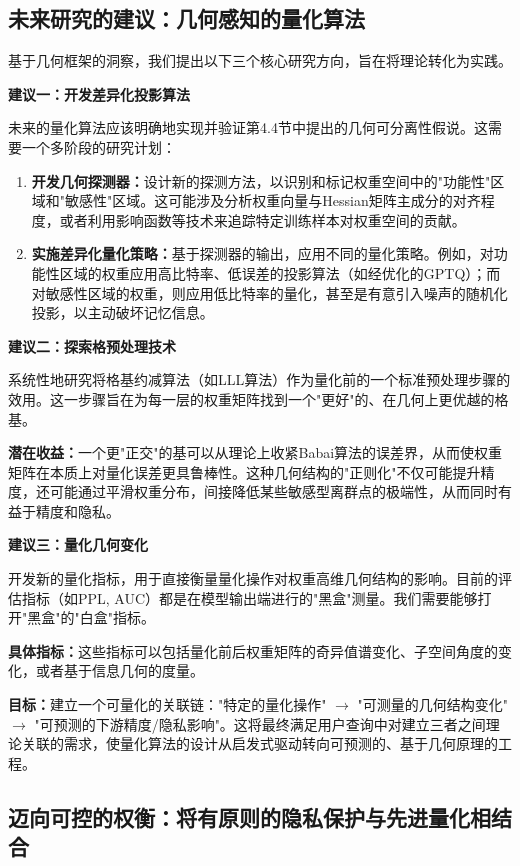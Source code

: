 \documentclass[letterpaper,twocolumn,10pt]{article}
\begin{document}
\subsection{未来研究的建议：几何感知的量化算法}

基于几何框架的洞察，我们提出以下三个核心研究方向，旨在将理论转化为实践。

\textbf{建议一：开发差异化投影算法}

未来的量化算法应该明确地实现并验证第4.4节中提出的几何可分离性假说。这需要一个多阶段的研究计划：

\begin{enumerate}
\item \textbf{开发几何探测器：}设计新的探测方法，以识别和标记权重空间中的"功能性"区域和"敏感性"区域。这可能涉及分析权重向量与Hessian矩阵主成分的对齐程度，或者利用影响函数等技术来追踪特定训练样本对权重空间的贡献。
\item \textbf{实施差异化量化策略：}基于探测器的输出，应用不同的量化策略。例如，对功能性区域的权重应用高比特率、低误差的投影算法（如经优化的GPTQ）；而对敏感性区域的权重，则应用低比特率的量化，甚至是有意引入噪声的随机化投影，以主动破坏记忆信息。
\end{enumerate}

\textbf{建议二：探索格预处理技术}

系统性地研究将格基约减算法（如LLL算法）作为量化前的一个标准预处理步骤的效用。这一步骤旨在为每一层的权重矩阵找到一个"更好"的、在几何上更优越的格基。

\textbf{潜在收益：}一个更"正交"的基可以从理论上收紧Babai算法的误差界，从而使权重矩阵在本质上对量化误差更具鲁棒性。这种几何结构的"正则化"不仅可能提升精度，还可能通过平滑权重分布，间接降低某些敏感型离群点的极端性，从而同时有益于精度和隐私。

\textbf{建议三：量化几何变化}

开发新的量化指标，用于直接衡量量化操作对权重高维几何结构的影响。目前的评估指标（如PPL, AUC）都是在模型输出端进行的"黑盒"测量。我们需要能够打开"黑盒"的"白盒"指标。

\textbf{具体指标：}这些指标可以包括量化前后权重矩阵的奇异值谱变化、子空间角度的变化，或者基于信息几何的度量。

\textbf{目标：}建立一个可量化的关联链："特定的量化操作" $\rightarrow$ "可测量的几何结构变化" $\rightarrow$ "可预测的下游精度/隐私影响"。这将最终满足用户查询中对建立三者之间理论关联的需求，使量化算法的设计从启发式驱动转向可预测的、基于几何原理的工程。

\subsection{迈向可控的权衡：将有原则的隐私保护与先进量化相结合}
\end{document}
